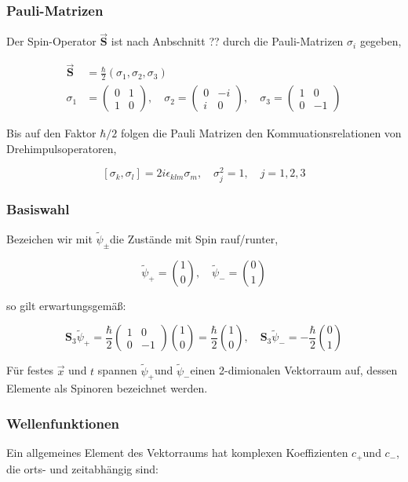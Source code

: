 \documentclass[10pt, letterpaper]{article}
\begin{document}
\subsubsection*{Pauli-Matrizen}
Der Spin-Operator $\overrightarrow{\mathbf{S}}$ ist nach Anbschnitt ?? durch die Pauli-Matrizen $\sigma_{i}$ gegeben,

$$
\begin{aligned}
\overrightarrow{\mathbf{S}} & =\frac{\hbar}{2}\left(\sigma_{1}, \sigma_{2}, \sigma_{3}\right) \\
\sigma_{1} & =\left(\begin{array}{cc}
0 & 1 \\
1 & 0
\end{array}\right), \quad \sigma_{2}=\left(\begin{array}{cc}
0 & -i \\
i & 0
\end{array}\right), \quad \sigma_{3}=\left(\begin{array}{cc}
1 & 0 \\
0 & -1
\end{array}\right)
\end{aligned}
$$

Bis auf den Faktor $\hbar / 2$ folgen die Pauli Matrizen den Kommuationsrelationen von Drehimpulsoperatoren,

$$
\left[\sigma_{k}, \sigma_{l}\right]=2 i \epsilon_{k l m} \sigma_{m}, \quad \sigma_{j}^{2}=1, \quad j=1,2,3
$$

\subsubsection*{Basiswahl}
Bezeichen wir mit $\tilde{\psi}_{ \pm}$die Zustände mit Spin rauf/runter,

$$
\tilde{\psi}_{+}=\binom{1}{0}, \quad \tilde{\psi}_{-}=\binom{0}{1}
$$

so gilt erwartungsgemäß:

$$
\mathbf{S}_{3} \tilde{\psi}_{+}=\frac{\hbar}{2}\left(\begin{array}{cc}
1 & 0 \\
0 & -1
\end{array}\right)\binom{1}{0}=\frac{\hbar}{2}\binom{1}{0}, \quad \mathbf{S}_{3} \tilde{\psi}_{-}=-\frac{\hbar}{2}\binom{0}{1}
$$

Für festes $\vec{x}$ und $t$ spannen $\tilde{\psi}_{+}$und $\tilde{\psi}_{-}$einen 2-dimionalen Vektorraum auf, dessen Elemente als Spinoren bezeichnet werden.

\subsubsection*{Wellenfunktionen}
Ein allgemeines Element des Vektorraums hat komplexen Koeffizienten $c_{+}$und $c_{-}$, die orts- und zeitabhängig sind:
\end{document}

